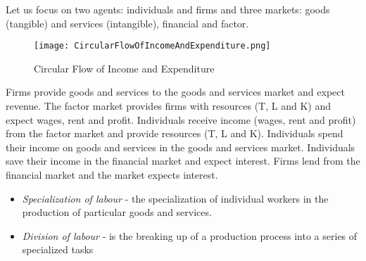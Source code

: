 \begin{example}
    Let us focus on two agents: individuals and firms and three markets: goods (tangible) and services (intangible), financial and factor.
    \begin{figure}[h!]
        \centering
        \texttt{[image: CircularFlowOfIncomeAndExpenditure.png]}
        \caption{Circular Flow of Income and Expenditure}
    \end{figure}
    Firms provide goods and services to the goods and services market and expect revenue.
    The factor market provides firms with resources (T, L and K) and expect wages, rent and profit.
    Individuals receive income (wages, rent and profit) from the factor market and provide resources (T, L and K).
    Individuals spend their income on goods and services in the goods and services market.
    Individuals save their income in the financial market and expect interest.
    Firms lend from the financial market and the market expects interest.

\end{example}
\begin{itemize}
    \item \begin{definition}
        \emph{Specialization of labour} - the specialization of
        individual workers in the production of particular goods and services.
    \end{definition}
    \item \begin{definition}
        \emph{Division of labour} - is the breaking up of a production process into a series of specialized tasks
    \end{definition}
\end{itemize}